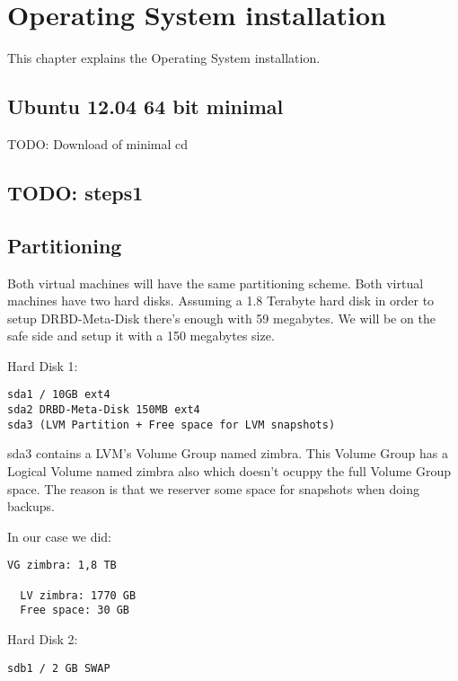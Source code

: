 

\chapter{Operating System installation}
This chapter explains the Operating System installation.

\section {Ubuntu 12.04 64 bit minimal}
TODO: Download of minimal cd

\section {TODO: steps1}
\section {Partitioning}
Both virtual machines will have the same partitioning scheme. Both virtual machines have two hard disks.
Assuming a 1.8 Terabyte hard disk in order to setup DRBD-Meta-Disk there's enough with 59 megabytes. We will be on the safe side and setup it with a 150 megabytes size.

Hard Disk 1:
\begin{verbatim}
sda1 / 10GB ext4
sda2 DRBD-Meta-Disk 150MB ext4
sda3 (LVM Partition + Free space for LVM snapshots)
\end{verbatim}

sda3 contains a LVM's Volume Group named zimbra.
This Volume Group has a Logical Volume named zimbra also which doesn't ocuppy the full Volume Group space. The reason is that we reserver some space for snapshots when doing backups.

In our case we did:
\begin{verbatim}
VG zimbra: 1,8 TB

  LV zimbra: 1770 GB
  Free space: 30 GB
\end{verbatim}


Hard Disk 2:
\begin{verbatim}
sdb1 / 2 GB SWAP
\end{verbatim}
